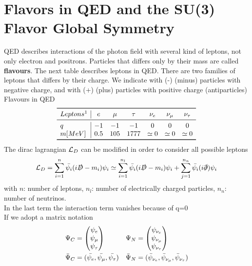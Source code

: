 \documentclass[TheoreticalPhy_ModB.tex]{subfiles}
\begin{document}
\section{Flavors in QED and the SU(3) Flavor Global Symmetry}
QED describes interactions of the photon field with several kind of leptons, not only electron and positrons. Particles that differs only by their mass are called \textbf{flavours}.
\skipline
The next table describes leptons in QED. There are two families of leptons that differs by their charge. We indicate with (-) (minus) particles with negative charge, and with (+) (plus) particles with positive charge (antiparticles)\\
\skipline
Flavours in QED
\[
\begin{array}{l | cccccc}
\toprule
Leptons \footnotemark	& e 		& \mu 	& \tau 	& \nu_e 		& \nu_{\mu} 	& \nu_{\tau} \\
\midrule
q					& -1		& -1		& -1		& 0			& 0			& 0 \\
m [MeV]				& 0.5		& 105	& 1777	& \simeq 0		& \simeq 0		& \simeq 0 \\
\bottomrule
\end{array}
\]
\skipline
The dirac lagrangian $\mathcal{L}_D$ can be modified in order to consider all possible leptons
\[
\mathcal{L}_D = \sum_{i=1}^n \bar{\psi_i} (i \slashed D - m_i) \psi_i
	\simeq \sum_{i=1}^{n_l} \bar{\psi_i} (i \slashed D - m_i) \psi_i
	+ \sum_{j=1}^{n_n} \bar{\psi_i} (i \slashed \partial) \psi_i
\]
with $n$: number of leptons, $n_l$: number of electrically charged particles, $n_n$: number of neutrinos.\\
In the last term the interaction term vanishes because of q=0\\
If we adopt a matrix notation
\begin{align}
\Psi_C & =
\begin{pmatrix}
\psi_e \\
\psi_{\mu} \\
\psi_{\tau}
\end{pmatrix}
&
\Psi_N & =
\begin{pmatrix}
\psi_{\nu_e} \\
\psi_{\nu_{\mu}} \\
\psi_{\nu_{\tau}}
\end{pmatrix}
\notag \\
\bar{\Psi}_C & = (\bar{\psi_e}, \bar{\psi_{\mu}}, \bar{\psi_{\tau}})
&
\bar{\Psi}_N & = (\bar{\psi}_{\nu_e}, \bar{\psi}_{\nu_{\mu}}, \bar{\psi}_{\nu_{\tau}})
\notag 
\end{align}
\end{document}

